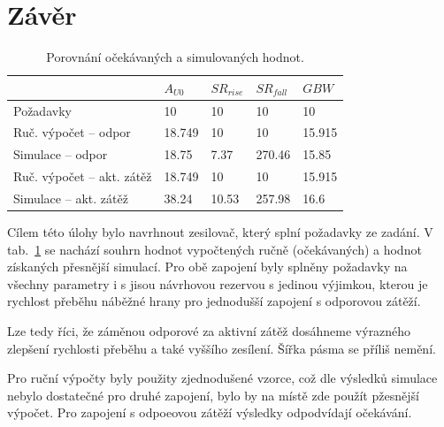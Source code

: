 \documentclass{protokol}
\begin{document}
\section{Závěr}
\begin{table}[]
  \centering
  \caption{Porovnání očekávaných a simulovaných hodnot.}
  \begin{tabular}{|l|l|l|l|l|}
  \hline
                             & \(A_{U0} \)     & \(SR_{rise} \)  & \(SR_{fall}\)  & \(GBW\)     \\ \hline
  Požadavky                  & \num{10} & \num{10} & \num{10} & \num{10} \\ \hline
  Ruč. výpočet -- odpor      & \num{18.749} & \num{10} & \num{10} & \num{15.915} \\ \hline
  Simulace -- odpor          & \num{18.75} & \num{7.37} & \num{270.46} & \num{15.85} \\ \hline
  Ruč. výpočet -- akt. zátěž & \num{18.749} & \num{10} & \num{10} & \num{15.915} \\ \hline
  Simulace -- akt. zátěž     & \num{38.24} & \num{10.53} & \num{257.98} & \num{16.6} \\ \hline
  \end{tabular}
  \label{tab:1-1-2_hodnoty}
\end{table}

Cílem této úlohy bylo navrhnout zesilovač, který splní požadavky ze zadání. V tab.~\ref{tab:1-1-2_hodnoty} se nachází souhrn hodnot vypočtených ručně (očekávaných) a hodnot získaných přesnější simulací. Pro obě zapojení byly splněny požadavky na všechny parametry i s jisou návrhovou rezervou s jedinou výjimkou, kterou je rychlost přeběhu náběžné hrany pro jednodušší zapojení s odporovou zátěží. 

Lze tedy říci, že záměnou odporové za aktivní zátěž dosáhneme výrazného zlepšení rychlosti přeběhu a také vyššího zesílení. Šířka pásma se příliš nemění.

Pro ruční výpočty byly použity zjednodušené vzorce, což dle výsledků simulace nebylo dostatečné pro druhé zapojení, bylo by na místě zde použít pžesnější výpočet. Pro zapojení s odpoeovou zátěží výsledky odpodvídají očekávání.
\end{document}
